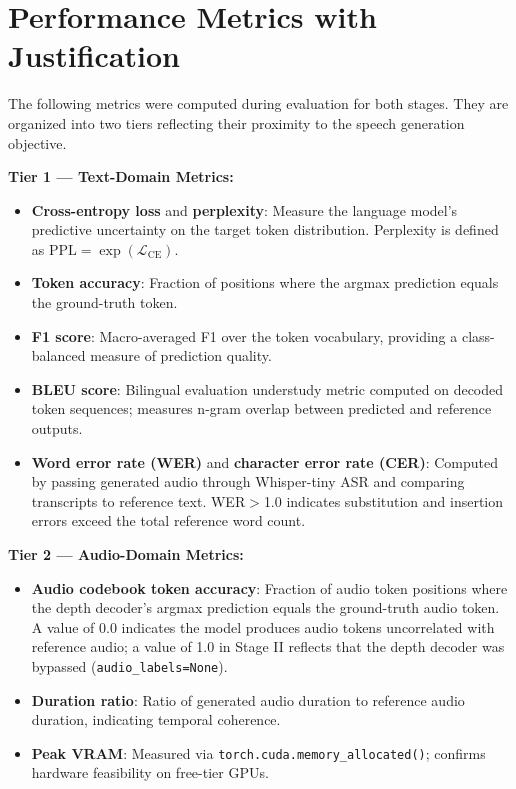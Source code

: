 \documentclass[conference]{IEEEtran}
\begin{document}
\section{Performance Metrics with Justification}
\label{sec:metrics}

The following metrics were computed during evaluation for both stages.
They are organized into two tiers reflecting their proximity to the
speech generation objective.

\textbf{Tier 1 --- Text-Domain Metrics:}
\begin{itemize}
  \item \textbf{Cross-entropy loss} and \textbf{perplexity}: Measure the
        language model's predictive uncertainty on the target token distribution.
        Perplexity is defined as $\text{PPL} = \exp(\mathcal{L}_{\text{CE}})$.
  \item \textbf{Token accuracy}: Fraction of positions where the argmax prediction
        equals the ground-truth token.
  \item \textbf{F1 score}: Macro-averaged F1 over the token vocabulary,
        providing a class-balanced measure of prediction quality.
  \item \textbf{BLEU score}: Bilingual evaluation understudy metric computed
        on decoded token sequences; measures n-gram overlap between predicted
        and reference outputs.
  \item \textbf{Word error rate (WER)} and \textbf{character error rate (CER)}:
        Computed by passing generated audio through Whisper-tiny ASR and
        comparing transcripts to reference text. WER$>$1.0 indicates
        substitution and insertion errors exceed the total reference word count.
\end{itemize}

\textbf{Tier 2 --- Audio-Domain Metrics:}
\begin{itemize}
  \item \textbf{Audio codebook token accuracy}: Fraction of audio token
        positions where the depth decoder's argmax prediction equals the
        ground-truth audio token.
        A value of 0.0 indicates the model produces audio tokens uncorrelated
        with reference audio; a value of 1.0 in Stage II reflects that the
        depth decoder was bypassed (\texttt{audio\_labels=None}).
  \item \textbf{Duration ratio}: Ratio of generated audio duration to
        reference audio duration, indicating temporal coherence.
  \item \textbf{Peak VRAM}: Measured via \texttt{torch.cuda.memory\_allocated()};
        confirms hardware feasibility on free-tier GPUs.
\end{itemize}
\end{document}
